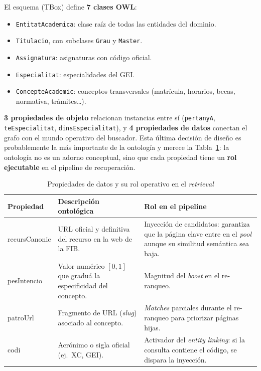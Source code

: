 \documentclass[12pt, a4paper, twoside]{report}
\begin{document}
El esquema (TBox) define \textbf{7 clases OWL}:

\begin{itemize}
  \item \texttt{EntitatAcademica}: clase ra\'iz de todas las entidades del dominio.
  \item \texttt{Titulacio}, con subclases \texttt{Grau} y \texttt{Master}.
  \item \texttt{Assignatura}: asignaturas con c\'odigo oficial.
  \item \texttt{Especialitat}: especialidades del GEI.
  \item \texttt{ConcepteAcademic}: conceptos transversales (matr\'icula, horarios, becas, normativa, tr\'amites\dots).
\end{itemize}

\textbf{3 propiedades de objeto} relacionan instancias entre s\'i (\texttt{pertanyA}, \texttt{teEspecialitat}, \texttt{dinsEspecialitat}), y \textbf{4 propiedades de datos} conectan el grafo con el mundo operativo del buscador. Esta \'ultima decisi\'on de dise\~no es probablemente la m\'as importante de la ontolog\'ia y merece la Tabla~\ref{tab:datatype_properties}: la ontolog\'ia no es un adorno conceptual, sino que cada propiedad tiene un \textbf{rol ejecutable} en el pipeline de recuperaci\'on.

\begin{table}[H]
\centering
\caption{Propiedades de datos y su rol operativo en el \textit{retrieval}}
\label{tab:datatype_properties}
\renewcommand{\arraystretch}{1.4}
\begin{tabularx}{\textwidth}{>{\ttfamily}lXX}
\toprule
\textbf{\textnormal{Propiedad}} & \textbf{Descripci\'on ontol\'ogica} & \textbf{Rol en el pipeline} \\
\midrule
recursCanonic & URL oficial y definitiva del recurso en la web de la FIB. & Inyecci\'on de candidatos: garantiza que la p\'agina clave entre en el \textit{pool} aunque su similitud sem\'antica sea baja. \\
pesIntencio & Valor num\'erico $[0,1]$ que gradu\'a la especificidad del concepto. & Magnitud del \textit{boost} en el re-ranqueo. \\
patroUrl & Fragmento de URL (\textit{slug}) asociado al concepto. & \textit{Matches} parciales durante el re-ranqueo para priorizar p\'aginas hijas. \\
codi & Acr\'onimo o sigla oficial (ej.\ XC, GEI). & Activador del \textit{entity linking}: si la consulta contiene el c\'odigo, se dispara la inyecci\'on. \\
\bottomrule
\end{tabularx}
\end{table}
\end{document}
